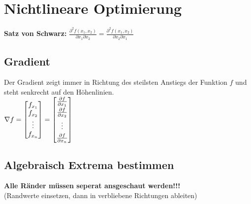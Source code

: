 


\section{Nichtlineare Optimierung}

\textbf{Satz von Schwarz:} $\frac{\partial^2 f(x_1, x_2)}{\partial x_1 \partial x_2} = \frac{\partial^2 f(x_1, x_2)}{\partial x_2 \partial x_1}$

\begin{minipage}[t]{0.4\linewidth}
\subsection{Gradient}
Der Gradient zeigt immer in Richtung des steilsten Anstiegs der Funktion $f$ und steht senkrecht auf den Höhenlinien.\\


$\nabla f =\begin{bmatrix}
f_{x_1}\\
f_{x_2}\\
\vdots\\
f_{x_n}
\end{bmatrix}=\begin{bmatrix}
\frac{\partial f}{\partial x_1}\\[0.1cm]
\frac{\partial f}{\partial x_2}\\[0.1cm]
\vdots\\[0.1cm]
\frac{\partial f}{\partial x_n}
\end{bmatrix}$
\end{minipage}
\hfill
\begin{minipage}[t]{0.58\linewidth}
	\subsection{Algebraisch Extrema bestimmen}
	\textbf{Alle Ränder müssen seperat ansgeschaut werden!!!}\\
	(Randwerte einsetzen, dann in verbliebene Richtungen ableiten)\\
	
	\\
\end{minipage}

